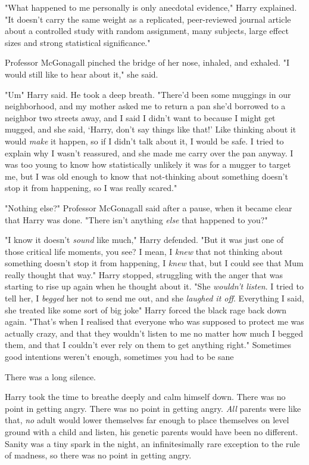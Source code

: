 "What happened to me personally is only anecdotal evidence," Harry explained.
"It doesn't carry the same weight as a replicated, peer-reviewed journal
article about a controlled study with random assignment, many subjects, large
effect sizes and strong statistical significance."

Professor McGonagall pinched the bridge of her nose, inhaled, and exhaled. "I
would still like to hear about it," she said.

"Um{\el}" Harry said. He took a deep breath. "There'd been some muggings in
our neighborhood, and my mother asked me to return a pan she'd borrowed to a
neighbor two streets away, and I said I didn't want to because I might get
mugged, and she said, `Harry, don't say things like that!' Like thinking about
it would \emph{make} it happen, so if I didn't talk about it, I would be safe.
I tried to explain why I wasn't reassured, and she made me carry over the pan
anyway. I was too young to know how statistically unlikely it was for a mugger
to target me, but I was old enough to know that not-thinking about something
doesn't stop it from happening, so I was really scared."

"Nothing else?" Professor McGonagall said after a pause, when it became clear
that Harry was done. "There isn't anything \emph{else} that happened to you?"

"I know it doesn't \emph{sound} like much," Harry defended. "But it was just
one of those critical life moments, you see? I mean, I \emph{knew} that not
thinking about something doesn't stop it from happening, I \emph{knew} that,
but I could see that Mum really thought that way." Harry stopped, struggling
with the anger that was starting to rise up again when he thought about it.
"She \emph{wouldn't listen}. I tried to tell her, I \emph{begged} her not to
send me out, and she \emph{laughed it off}. Everything I said, she treated like
some sort of big joke{\el}" Harry forced the black rage back down again.
"That's when I realised that everyone who was supposed to protect me was
actually crazy, and that they wouldn't listen to me no matter how much I begged
them, and that I couldn't ever rely on them to get anything right." Sometimes
good intentions weren't enough, sometimes you had to be sane{\el}

There was a long silence.

Harry took the time to breathe deeply and calm himself down. There was no point
in getting angry. There was no point in getting angry. \emph{All} parents were
like that, \emph{no} adult would lower themselves far enough to place
themselves on level ground with a child and listen, his genetic parents would
have been no different. Sanity was a tiny spark in the night, an
infinitesimally rare exception to the rule of madness, so there was no point in
getting angry.

